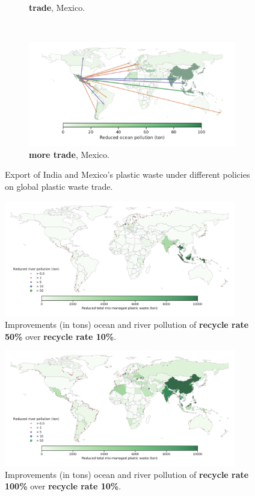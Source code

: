 \documentclass[dvipsnames]{article}
\begin{document}
\begin{figure}
\begin{subfigure}{0.47\textwidth}
    \caption{\textbf{trade}, Mexico.}
\end{subfigure}
~
\begin{subfigure}{0.47\textwidth}
    \centering
    \includegraphics[width=\textwidth]{figures/mex_trade_export_w10.pdf}
    \caption{\textbf{more trade}, Mexico.}
\end{subfigure}
\caption{Export of India and Mexico's plastic waste under different policies on global plastic waste trade.}
\label{fig:trade-graph-ind-mex}
\end{figure}

\begin{figure}[htb!] 
	\centering
		\includegraphics[width=0.9\textwidth]{figures/improvement_recycle5_ton_recycle.pdf}
	\caption{\small Improvements (in tons) ocean and river pollution of \textbf{recycle rate 50\%} over \textbf{recycle rate 10\%}.}
	\label{fig:improvement-recycle-50}
\end{figure}

\begin{figure}[htb!] 
	\centering
		\includegraphics[width=0.9\textwidth]{figures/improvement_recycle10_ton_recycle.pdf}
	\caption{\small Improvements (in tons) ocean and river pollution of \textbf{recycle rate 100\%} over \textbf{recycle rate 10\%}.}
	\label{fig:improvement-recycle-100}
\end{figure}
\end{document}
